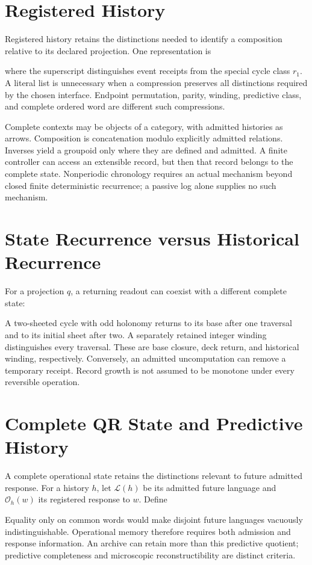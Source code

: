 \section{Registered History}\label{sec:history}
Registered history retains the distinctions needed to identify a composition relative to its declared projection. One representation is

where the superscript distinguishes event receipts from the special cycle class $r_1$. A literal list is unnecessary when a compression preserves all distinctions required by the chosen interface. Endpoint permutation, parity, winding, predictive class, and complete ordered word are different such compressions.

Complete contexts may be objects of a category, with admitted histories as arrows. Composition is concatenation modulo explicitly admitted relations. Inverses yield a groupoid only where they are defined and admitted. A finite controller can access an extensible record, but then that record belongs to the complete state. Nonperiodic chronology requires an actual mechanism beyond closed finite deterministic recurrence; a passive log alone supplies no such mechanism.






\section{State Recurrence versus Historical Recurrence}\label{sec:historyconsequences}
For a projection $q$, a returning readout can coexist with a different complete state:

A two-sheeted cycle with odd holonomy returns to its base after one traversal and to its initial sheet after two. A separately retained integer winding distinguishes every traversal. These are base closure, deck return, and historical winding, respectively. Conversely, an admitted uncomputation can remove a temporary receipt. Record growth is not assumed to be monotone under every reversible operation.

\section{Complete QR State and Predictive History}\label{sec:predictive}
A complete operational state retains the distinctions relevant to future admitted response. For a history $h$, let $\mathcal L(h)$ be its admitted future language and $\mathcal O_h(w)$ its registered response to $w$. Define


Equality only on common words would make disjoint future languages vacuously indistinguishable. Operational memory therefore requires both admission and response information. An archive can retain more than this predictive quotient; predictive completeness and microscopic reconstructibility are distinct criteria.

